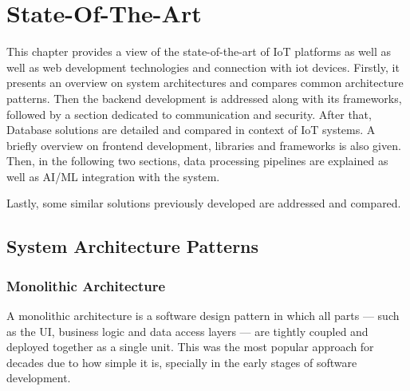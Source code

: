 
%

\chapter{State-Of-The-Art}
\label{cha:State-Of-The-Art}

This chapter provides a view of the state-of-the-art of \gls{IoT} platforms as well
as well as web development technologies and connection with iot devices.
Firstly, it presents an overview on system architectures and compares common
architecture patterns. Then the backend development is addressed along with
its frameworks, followed by a section dedicated to communication and security.
After that, Database solutions are detailed and compared in context of IoT
systems. A briefly overview on frontend development, libraries and frameworks is
also given.
Then, in the following two sections, data processing pipelines are explained as
well as \gls{AI}/\gls{ML} integration with the system.

Lastly, some similar solutions previously developed are addressed and compared.

\section{System Architecture Patterns}

\subsection{Monolithic Architecture}
A monolithic architecture is a software design pattern in which all parts ---
such as the \gls{UI}, business logic and data access layers --- are tightly
coupled and deployed together as a single unit\cite{7436659,10031648}. This
was the most popular approach for decades due to how simple it is, specially in
the early stages of software development\cite{Garlan2018}.

